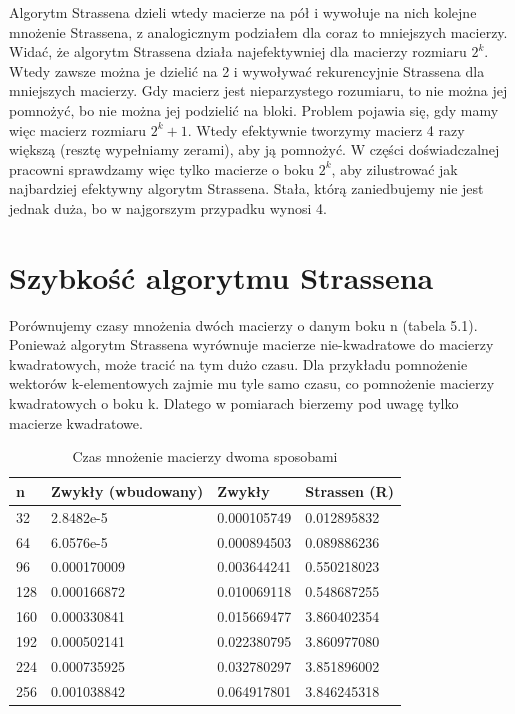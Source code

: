 \documentclass[paper=a4, fontsize=11pt]{scrartcl} %
\numberwithin{equation}{section} %
\numberwithin{figure}{section} %
\numberwithin{table}{section} %
\begin{document}
Algorytm Strassena dzieli wtedy macierze na pół i wywołuje na nich kolejne mnożenie Strassena, z analogicznym podziałem dla coraz to mniejszych macierzy. \\

Widać, że algorytm Strassena działa najefektywniej dla macierzy rozmiaru 
${2^k}$. Wtedy zawsze można je dzielić na 2 i wywoływać rekurencyjnie Strassena dla mniejszych macierzy. Gdy macierz jest nieparzystego rozumiaru, to nie można jej pomnożyć, bo nie można jej podzielić na bloki. Problem pojawia się, gdy mamy więc macierz rozmiaru 
${2^k+1}$. Wtedy efektywnie tworzymy macierz 4 razy większą (resztę wypełniamy zerami), aby ją pomnożyć.
W części doświadczalnej pracowni sprawdzamy więc tylko macierze o boku ${2^k}$, aby zilustrować jak najbardziej efektywny algorytm Strassena.
Stała, którą zaniedbujemy nie jest jednak duża, bo w najgorszym przypadku wynosi 4.

\section{Szybkość algorytmu Strassena}

Porównujemy czasy mnożenia dwóch macierzy o danym boku n (tabela 5.1).
Ponieważ algorytm Strassena wyrównuje macierze nie-kwadratowe do macierzy kwadratowych, może tracić na tym dużo czasu.
Dla przykładu pomnożenie wektorów k-elementowych zajmie mu tyle samo czasu, co pomnożenie macierzy kwadratowych o boku k.
Dlatego w pomiarach bierzemy pod uwagę tylko macierze kwadratowe.\medbreak
\begin{table}[h!]
\caption{Czas mnożenie macierzy dwoma sposobami}
\label{my-label}
\begin{tabular}{|l|l|l|l|}
\hline
n	&	Zwykły (wbudowany)	&	Zwykły	&	Strassen (R)	\\  \hline
32	&	2.8482e-5	&	0.000105749	&	0.012895832\\  \hline
64	&	6.0576e-5	&	0.000894503	&	0.089886236\\  \hline
96	&	0.000170009	&	0.003644241	&	0.550218023\\  \hline
128	&	0.000166872	&	0.010069118	&	0.548687255\\  \hline
160	&	0.000330841	&	0.015669477	&	3.860402354\\  \hline
192	&	0.000502141	&	0.022380795	&	3.860977080\\  \hline
224	&	0.000735925	&	0.032780297	&	3.851896002\\  \hline
256 &	0.001038842	&	0.064917801	&	3.846245318\\
\hline
\end{tabular}
\end{table}
\end{document}
